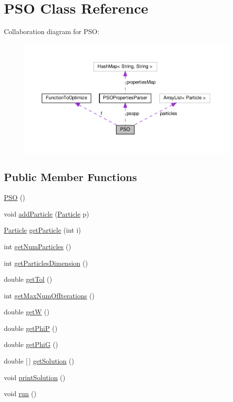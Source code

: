 \hypertarget{class_p_s_o}{}\section{P\+SO Class Reference}
\label{class_p_s_o}


Collaboration diagram for P\+SO\+:
\nopagebreak
\begin{figure}[H]
\begin{center}
\leavevmode
\includegraphics[width=350pt]{class_p_s_o__coll__graph}
\end{center}
\end{figure}
\subsection*{Public Member Functions}
\begin{DoxyCompactItemize}
\item 
\hyperlink{class_p_s_o_a0aeec4970276a5e318b613e8a192064e}{P\+SO} ()
\item 
void \hyperlink{class_p_s_o_ac3676d8b4b6eb1fcb0c05a14a20af85c}{add\+Particle} (\hyperlink{class_particle}{Particle} p)
\item 
\hyperlink{class_particle}{Particle} \hyperlink{class_p_s_o_a3c697a11238d768ae2b1236d3cf6ea88}{get\+Particle} (int i)
\item 
int \hyperlink{class_p_s_o_acc2a16aac995a30f3265fa06182509af}{get\+Num\+Particles} ()
\item 
int \hyperlink{class_p_s_o_a46ddfeb9df3a42b2f1b2c4fe0d8f51b2}{get\+Particles\+Dimension} ()
\item 
double \hyperlink{class_p_s_o_a57be39727a5a7e22182c82d4274ba3ae}{get\+Tol} ()
\item 
int \hyperlink{class_p_s_o_a0d3cd48e829ba5ccb754e26f1890e51b}{get\+Max\+Num\+Of\+Iterations} ()
\item 
double \hyperlink{class_p_s_o_a50f5f8be53be944150317d590c411144}{getW} ()
\item 
double \hyperlink{class_p_s_o_a51bdbe662e545c50ac984abdba9f6448}{get\+PhiP} ()
\item 
double \hyperlink{class_p_s_o_a9ddf1bc2e611d1959fe4f6fdef960b0e}{get\+PhiG} ()
\item 
double \mbox{[}$\,$\mbox{]} \hyperlink{class_p_s_o_af3fe18f93011219d7fc3badc9220b54b}{get\+Solution} ()
\item 
void \hyperlink{class_p_s_o_a83a2cd74d2176ea147b84e17050ceffb}{print\+Solution} ()
\item 
void \hyperlink{class_p_s_o_a689d26e00d138c809a4de0a34e98cd0a}{run} ()
\end{DoxyCompactItemize}
